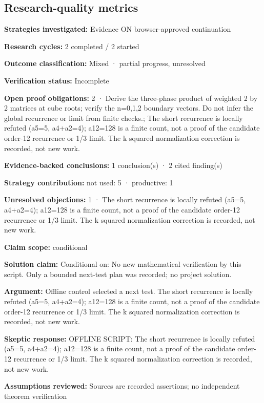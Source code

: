 \documentclass[11pt]{article}
\begin{document}
\subsection{Research-quality metrics}
\textbf{Strategies investigated:} Evidence ON browser-approved continuation\par
\textbf{Research cycles:} 2 completed / 2 started\par
\textbf{Outcome classification:} Mixed · partial progress, unresolved\par
\textbf{Verification status:} Incomplete\par
\textbf{Open proof obligations:} 2 · Derive the three-phase product of weighted 2 by 2 matrices at cube roots; verify the n=0,1,2 boundary vectors. Do not infer the global recurrence or limit from finite checks.; The short recurrence is locally refuted (a5=5, a4+a2=4); a12=128 is a finite count, not a proof of the candidate order-12 recurrence or 1/3 limit. The k squared normalization correction is recorded, not new work.\par
\textbf{Evidence-backed conclusions:} 1 conclusion(s) · 2 cited finding(s)\par
\textbf{Strategy contribution:} not used: 5 · productive: 1\par
\textbf{Unresolved objections:} 1 · The short recurrence is locally refuted (a5=5, a4+a2=4); a12=128 is a finite count, not a proof of the candidate order-12 recurrence or 1/3 limit. The k squared normalization correction is recorded, not new work.\par
\textbf{Claim scope:} conditional\par
\textbf{Solution claim:} Conditional on: No new mathematical verification by this script. Only a bounded next-test plan was recorded; no project solution.\par
\textbf{Argument:} Offline control selected a next test. The short recurrence is locally refuted (a5=5, a4+a2=4); a12=128 is a finite count, not a proof of the candidate order-12 recurrence or 1/3 limit. The k squared normalization correction is recorded, not new work.\par
\textbf{Skeptic response:} OFFLINE SCRIPT: The short recurrence is locally refuted (a5=5, a4+a2=4); a12=128 is a finite count, not a proof of the candidate order-12 recurrence or 1/3 limit. The k squared normalization correction is recorded, not new work.\par
\textbf{Assumptions reviewed:} Sources are recorded assertions; no independent theorem verification\par
\end{document}
